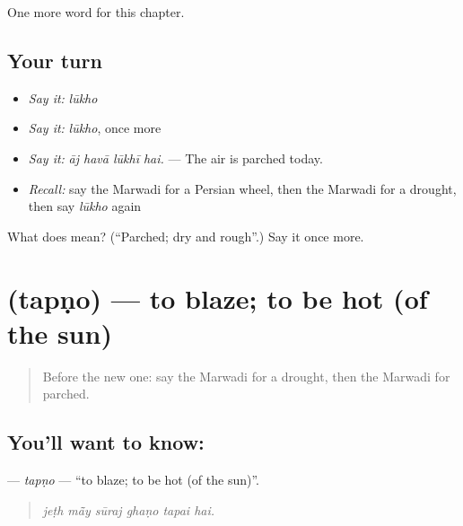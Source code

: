 \begin{grammarlens}[title={What you've built}]
One more word for this chapter.
\end{grammarlens}

\subsection*{Your turn}
\begin{itemize}
\raggedright
  \item \emph{Say it:} \emph{lūkho}
  \item \emph{Say it:} \emph{lūkho}, once more
  \item \emph{Say it:} \emph{āj havā lūkhī hai.} — The air is parched today.
  \item \emph{Recall:} say the Marwadi for a Persian wheel, then the Marwadi for a drought, then say \emph{lūkho} again
\end{itemize}

\begin{tcolorbox}[breakable,colback=teal!4,colframe=teal!35!black,title={Before you move on}]
What does  mean? (\textquotedblleft{}Parched; dry and rough\textquotedblright{}.) Say it once more.
\end{tcolorbox}
\section[\texorpdfstring{\mw{तपणो} (tapṇo)}{तपणो (tapṇo)}]{ (tapṇo) — to blaze; to be hot (of the sun)}

\label{lesson:MW-C228-tapno}



\begin{quote}
Before the new one: say the Marwadi for a drought, then the Marwadi for parched.
\end{quote}

\subsection*{You'll want to know: }
\textbf{} — \emph{tapṇo} — \textquotedblleft{}to blaze; to be hot (of the sun)\textquotedblright{}.

\begin{quote}
     
\end{quote}

\begin{quote}
\emph{jeṭh mā̃y sūraj ghaṇo tapai hai.}
\end{quote}

